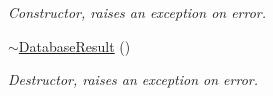 \begin{DoxyCompactItemize}
\begin{DoxyCompactList}\small\item\em Constructor, raises an exception on error. \item\end{DoxyCompactList}\item 
\hypertarget{classDatabaseResult_a67e279aafefdea3dcf1a61540dfa6c8b}{
\hyperlink{classDatabaseResult_a67e279aafefdea3dcf1a61540dfa6c8b}{$\sim$DatabaseResult} ()}
\label{classDatabaseResult_a67e279aafefdea3dcf1a61540dfa6c8b}

\begin{DoxyCompactList}\small\item\em Destructor, raises an exception on error. \item\end{DoxyCompactList}\end{DoxyCompactItemize}
